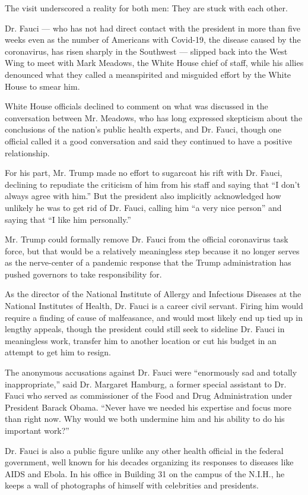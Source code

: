 The visit underscored a reality for both men: They are stuck with each
other.

Dr. Fauci --- who has not had direct contact with the president in more
than five weeks even as the number of Americans with Covid-19, the
disease caused by the coronavirus, has risen sharply in the Southwest
--- slipped back into the West Wing to meet with Mark Meadows, the White
House chief of staff, while his allies denounced what they called a
meanspirited and misguided effort by the White House to smear him.

White House officials declined to comment on what was discussed in the
conversation between Mr. Meadows, who has long expressed skepticism
about the conclusions of the nation's public health experts, and Dr.
Fauci, though one official called it a good conversation and said they
continued to have a positive relationship.

For his part, Mr. Trump made no effort to sugarcoat his rift with Dr.
Fauci, declining to repudiate the criticism of him from his staff and
saying that ``I don't always agree with him.'' But the president also
implicitly acknowledged how unlikely he was to get rid of Dr. Fauci,
calling him ``a very nice person'' and saying that ``I like him
personally.''

Mr. Trump could formally remove Dr. Fauci from the official coronavirus
task force, but that would be a relatively meaningless step because it
no longer serves as the nerve-center of a pandemic response that the
Trump administration has pushed governors to take responsibility for.

As the director of the National Institute of Allergy and Infectious
Diseases at the National Institutes of Health, Dr. Fauci is a career
civil servant. Firing him would require a finding of cause of
malfeasance, and would most likely end up tied up in lengthy appeals,
though the president could still seek to sideline Dr. Fauci in
meaningless work, transfer him to another location or cut his budget in
an attempt to get him to resign.

The anonymous accusations against Dr. Fauci were ``enormously sad and
totally inappropriate,'' said Dr. Margaret Hamburg, a former special
assistant to Dr. Fauci who served as commissioner of the Food and Drug
Administration under President Barack Obama. ``Never have we needed his
expertise and focus more than right now. Why would we both undermine him
and his ability to do his important work?''

Dr. Fauci is also a public figure unlike any other health official in
the federal government, well known for his decades organizing its
responses to diseases like AIDS and Ebola. In his office in Building 31
on the campus of the N.I.H., he keeps a wall of photographs of himself
with celebrities and presidents.

